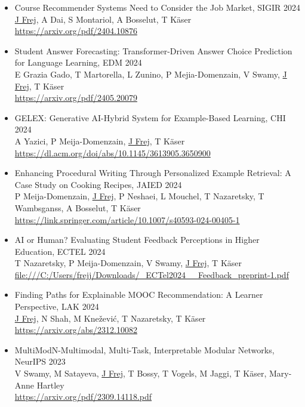 
\begin{itemize}
        \item Course Recommender Systems Need to Consider the Job Market, \textcolor{maincol}{SIGIR 2024}\\ \underline{J Frej}, A Dai, S Montariol, A Bosselut, T Käser\\\url{https://arxiv.org/pdf/2404.10876}
        \item Student Answer Forecasting: Transformer-Driven Answer Choice Prediction for Language Learning, \textcolor{maincol}{EDM 2024}\\  E Grazia Gado, T Martorella, L Zunino, P Mejia-Domenzain, V Swamy, \underline{J Frej}, T Käser \\\url{https://arxiv.org/pdf/2405.20079}
        \item GELEX: Generative AI-Hybrid System for Example-Based Learning, \textcolor{maincol}{CHI 2024}\\ A Yazici, P Meija-Domenzain, \underline{J Frej}, T Käser\\\url{https://dl.acm.org/doi/abs/10.1145/3613905.3650900}
        \item Enhancing Procedural Writing Through Personalized Example Retrieval: A Case Study on Cooking Recipes, \textcolor{maincol}{JAIED 2024}\\ P Meija-Domenzain, \underline{J Frej}, P Neshaei, L Mouchel, T Nazaretsky, T Wambsganss, A Bosselut, T Käser\\\url{https://link.springer.com/article/10.1007/s40593-024-00405-1}
        \item AI or Human? Evaluating Student Feedback Perceptions in Higher Education, \textcolor{maincol}{ECTEL  2024}\\ T Nazaretsky, P Meija-Domenzain, V Swamy, \underline{J Frej}, T Käser\\\url{file:///C:/Users/frejj/Downloads/_ECTel2024__Feedback_preprint-1.pdf}
        \item Finding Paths for Explainable MOOC Recommendation: A Learner Perspective, \textcolor{maincol}{LAK 2024}\\ \underline{J Frej}, N Shah, M Knežević, T Nazaretsky, T Käser\\\url{https://arxiv.org/abs/2312.10082}
        \item MultiModN-Multimodal, Multi-Task, Interpretable Modular Networks, \textcolor{maincol}{NeurIPS 2023}\\V Swamy, M Satayeva, \underline{J Frej}, T Bossy, T Vogels, M Jaggi, T Käser, Mary-Anne Hartley\\\url{https://arxiv.org/pdf/2309.14118.pdf}

\end{itemize}
